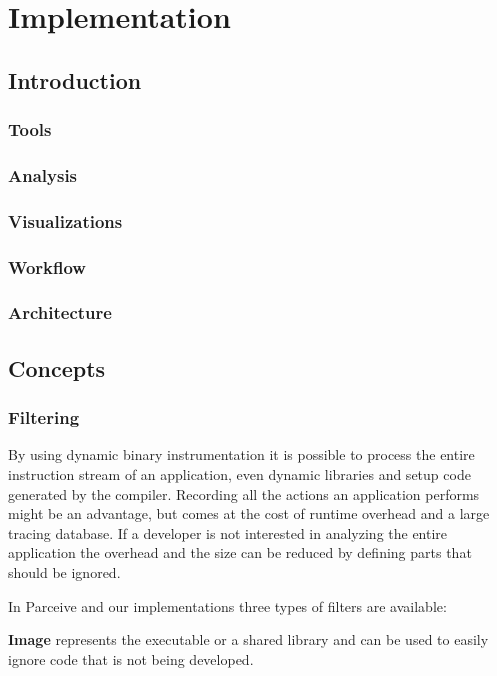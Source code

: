 \chapter{Implementation}

\section{Introduction}

\subsection{Tools}
\subsection{Analysis}
\subsection{Visualizations}
\subsection{Workflow}
\subsection{Architecture}

\section{Concepts}

\subsection{Filtering}

By using dynamic binary instrumentation it is possible to process the entire instruction stream of an application, even dynamic libraries and setup code generated by the compiler. Recording all the actions an application performs might be an advantage, but comes at the cost of runtime overhead and a large tracing database. If a developer is not interested in analyzing the entire application the overhead and the size can be reduced by defining parts that should be ignored.

In Parceive and our implementations three types of filters are available:

\textbf{Image} represents the executable or a shared library and can be used to easily ignore code that is not being developed.

